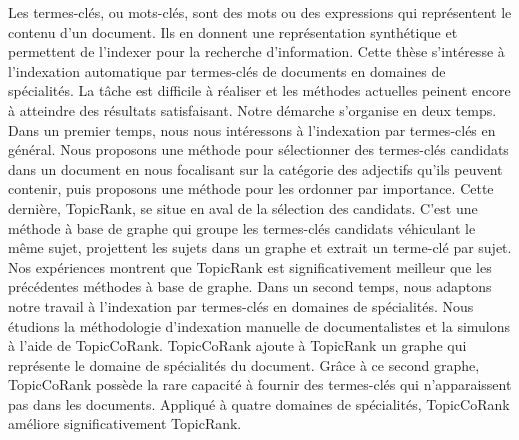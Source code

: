 Les termes-clés, ou mots-clés, sont des mots ou des expressions qui représentent
le contenu d'un document. Ils en donnent une représentation synthétique et
permettent de l'indexer pour la recherche d'information. Cette thèse s'intéresse
à l'indexation automatique par termes-clés de documents en domaines de
spécialités. La tâche est difficile à réaliser et les méthodes actuelles peinent
encore à atteindre des résultats satisfaisant. Notre démarche s'organise en deux
temps. Dans un premier temps, nous nous intéressons à l'indexation par
termes-clés en général. Nous proposons une méthode pour sélectionner des
termes-clés candidats dans un document en nous focalisant sur la catégorie des
adjectifs qu'ils peuvent contenir, puis proposons une méthode pour les ordonner
par importance. Cette dernière, TopicRank, se situe en aval de la sélection des
candidats. C'est une méthode à base de graphe qui groupe les termes-clés
candidats véhiculant le même sujet, projettent les sujets dans un graphe et
extrait un terme-clé par sujet. Nos expériences montrent que TopicRank est
significativement meilleur que les précédentes méthodes à base de graphe. Dans
un second temps, nous adaptons notre travail à l'indexation par termes-clés en
domaines de spécialités. Nous étudions la méthodologie d'indexation manuelle de
documentalistes et la simulons à l'aide de TopicCoRank. TopicCoRank ajoute à
TopicRank un graphe qui représente le domaine de spécialités du document. Grâce
à ce second graphe, TopicCoRank possède la rare capacité à fournir des
termes-clés qui n'apparaissent pas dans les documents. Appliqué à quatre
domaines de spécialités, TopicCoRank améliore significativement TopicRank.

